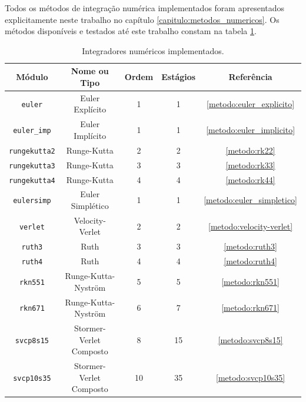 Todos os métodos de integração numérica implementados foram apresentados explicitamente neste trabalho no capítulo \ref{capitulo:metodos_numericos}. Os métodos disponíveis e testados até este trabalho constam na tabela \ref{tab:integradores_implementados}.
\begin{table}[]
    \centering
    \begin{tabular}{|c|c|c|c|c|}
        \hline
        \textbf{Módulo} & \textbf{Nome ou Tipo} & \textbf{Ordem} & \textbf{Estágios} & \textbf{Referência}
        \\ \hline
        \verb|euler|     & Euler Explícito & 1 & 1 & \ref{metodo:euler_explicito}
        \\ \hline
        \verb|euler_imp| & Euler Implícito & 1 & 1 & \ref{metodo:euler_implicito}
        \\ \hline
        \verb|rungekutta2| & Runge-Kutta & 2 & 2 & \ref{metodo:rk22}
        \\ \hline
        \verb|rungekutta3| & Runge-Kutta & 3 & 3 & \ref{metodo:rk33}
        \\ \hline
        \verb|rungekutta4| & Runge-Kutta & 4 & 4 & \ref{metodo:rk44}
        \\ \hline
        \verb|eulersimp| & Euler Simplético & 1 & 1 & \ref{metodo:euler_simpletico}
        \\ \hline
        \verb|verlet|    & Velocity-Verlet & 2 & 2 & \ref{metodo:velocity-verlet}
        \\ \hline
        \verb|ruth3|     & Ruth & 3 & 3 & \ref{metodo:ruth3}
        \\ \hline
        \verb|ruth4|     & Ruth & 4 & 4 & \ref{metodo:ruth4}
        \\ \hline
        \verb|rkn551|    & Runge-Kutta-Nyström & 5 & 5 & \ref{metodo:rkn551}
        \\ \hline
        \verb|rkn671|    & Runge-Kutta-Nyström & 6 & 7 & \ref{metodo:rkn671}
        \\ \hline
        \verb|svcp8s15|  & Stormer-Verlet Composto & 8 & 15 & \ref{metodo:svcp8s15}
        \\ \hline
        \verb|svcp10s35| & Stormer-Verlet Composto & 10 & 35 & \ref{metodo:svcp10s35}
        \\ \hline
    \end{tabular}
    \caption{Integradores numéricos implementados.}
    \label{tab:integradores_implementados}
\end{table}


